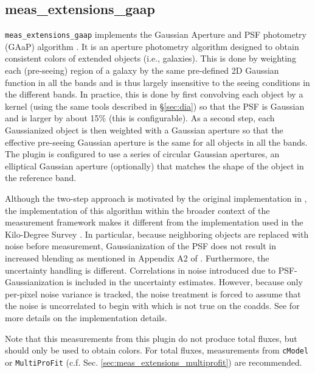 \subsection{meas\_extensions\_gaap}
\label{sec:meas_extensions_gaap}

\texttt{meas\_extensions\_gaap} implements the Gaussian Aperture and PSF photometry (GAaP) algorithm \citep{2008A&A...482.1053K}.
It is an aperture photometry algorithm designed to obtain consistent colors of extended objects (i.e., galaxies).
This is done by weighting each (pre-seeing) region of a galaxy by the same pre-defined 2D Gaussian function in all the bands and is thus largely insensitive to the seeing conditions in the different bands.
In practice, this is done by first convolving each object by a kernel (using the same tools described in \S\ref{sec:dia}) so that the PSF is Gaussian and is larger by about 15\% (this is configurable).
As a second step, each Gaussianized object is then weighted with a Gaussian aperture so that the effective pre-seeing Gaussian aperture is the same for all objects in all the bands.
The plugin is configured to use a series of circular Gaussian apertures, an elliptical Gaussian aperture (optionally) that matches the shape of the object in the reference band.

Although the two-step approach is motivated by the original implementation in \cite{2008A&A...482.1053K}, the implementation of this algorithm within the broader context of the measurement framework makes it different from the implementation used in the Kilo-Degree Survey \citep[KiDS;][]{2025arXiv250319439W}.
In particular, because neighboring objects are replaced with noise before measurement, Gaussianization of the PSF does not result in increased blending as mentioned in Appendix A2 of \cite{2015MNRAS.454.3500K}.
Furthermore, the uncertainty handling is different.
Correlations in noise introduced due to PSF-Gaussianization is included in the uncertainty estimates.
However, because only per-pixel noise variance is tracked, the noise treatment is forced to assume that the noise is uncorrelated to begin with which is not true on the coadds.
See \cite{DMTN-190} for more details on the implementation details.

Note that this measurements from this plugin do not produce total fluxes, but should only be used to obtain colors.
For total fluxes, measurements from \texttt{cModel} or \texttt{MultiProFit} (c.f. Sec. \ref{sec:meas_extensions_multiprofit}) are recommended.
